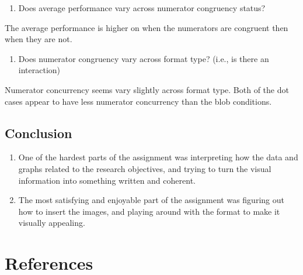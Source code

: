 \documentclass[
  man,floatsintext]{apa6}
\providecommand{\tightlist}{%
  \setlength{\itemsep}{0pt}\setlength{\parskip}{0pt}}
\begin{document}
\begin{enumerate}
\def\labelenumi{\arabic{enumi}.}
\setcounter{enumi}{1}
\tightlist
\item
  Does average performance vary across numerator congruency status?
\end{enumerate}

The average performance is higher on when the numerators are congruent then when they are not.

\begin{enumerate}
\def\labelenumi{\arabic{enumi}.}
\setcounter{enumi}{2}
\tightlist
\item
  Does numerator congruency vary across format type? (i.e., is there an interaction)
\end{enumerate}

Numerator concurrency seems vary slightly across format type. Both of the dot cases appear to have less numerator concurrency than the blob conditions.

\subsection{Conclusion}\label{conclusion}

\begin{enumerate}
\def\labelenumi{\arabic{enumi}.}
\item
  One of the hardest parts of the assignment was interpreting how the data and graphs related to the research objectives, and trying to turn the visual information into something written and coherent.
\item
  The most satisfying and enjoyable part of the assignment was figuring out how to insert the images, and playing around with the format to make it visually appealing.
\end{enumerate}

\newpage

\section{References}\label{references}
\end{document}
